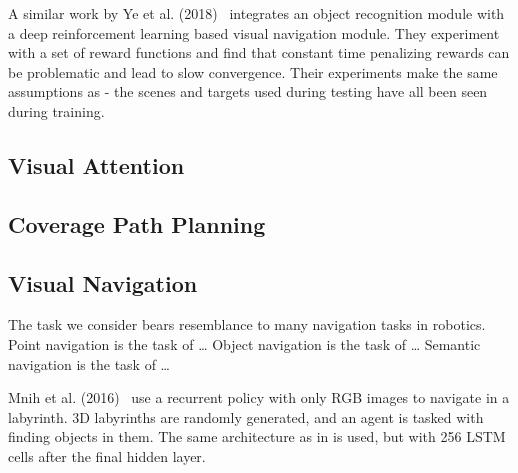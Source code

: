 A similar work by Ye et al. (2018)~\cite{ye_active_2018} integrates an object recognition module with a deep reinforcement learning based visual navigation module.
They experiment with a set of reward functions and find that constant time penalizing rewards can be problematic and lead to slow convergence.
Their experiments make the same assumptions as \cite{zhu_target_driven} - the scenes and targets used during testing have all been seen during training.



\subsection{Visual Attention}



\cite{minut_mahadevan_2001}

\subsection{Coverage Path Planning}

\cite{galceran_carreras_2013} %

\cite{krishna_tetromino_2020} %

\subsection{Visual Navigation}

The task we consider bears resemblance to many navigation tasks in robotics.
Point navigation is the task of \dots
Object navigation is the task of \dots
Semantic navigation is the task of \dots

Mnih et al. (2016)~\cite{mnih_asynchronous_2016} use a recurrent policy with only RGB images to navigate in a labyrinth.
3D labyrinths are randomly generated, and an agent is tasked with finding objects in them.
The same architecture as in \cite{mnih_human_2015} is used, but with 256 LSTM cells after the final hidden layer.

